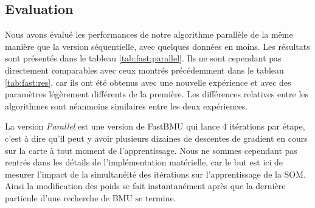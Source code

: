 	\subsection{Evaluation}

	Nous avons évalué les performances de notre algorithme parallèle de la même manière que la version séquentielle, avec quelques données en moins. Les résultats sont présentés dans le tableau \ref{tab:fast:parallel}. Ils ne sont cependant pas directement comparables avec ceux montrés précédemment dans le tableau \ref{tab:fast:res}, car ils ont été obtenus avec une nouvelle expérience et avec des paramètres légèrement différents de la première. Les différences relatives entre les algorithmes sont néanmoins similaires entre les deux expériences.

	La version \textit{Parallel} est une version de FastBMU qui lance 4 itérations par étape, c'est à dire qu'il peut y avoir plusieurs dizaines de descentes de gradient en cours sur la carte à tout moment de l'apprentissage. Nous ne sommes cependant pas rentrés dans les détails de l'implémentation matérielle, car le but est ici de mesurer l'impact de la simultanéité des itérations sur l'apprentissage de la SOM. Ainsi la modification des poids se fait instantanément après que la dernière particule d'une recherche de BMU se termine.

